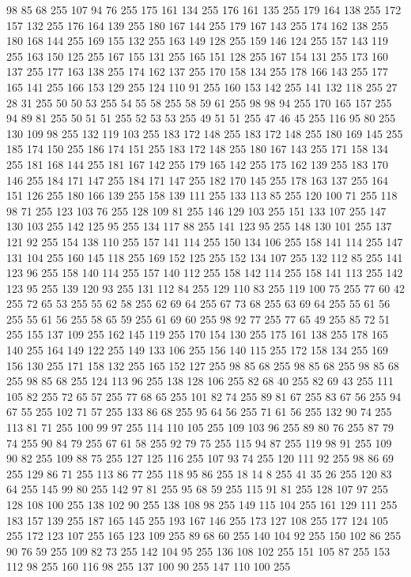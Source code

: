 98 85 68 255 107 94 76 255 175 161 134 255 176 161 135 255 179 164 138 255 172 157 132 255 176 164 139 255 180 167 144 255 179 167 143 255 174 162 138 255 180 168 144 255 169 155 132 255 163 149 128 255 159 146 124 255 157 143 119 255 163 150 125 255 167 155 131 255 165 151 128 255 167 154 131 255 173 160 137 255 177 163 138 255 174 162 137 255 170 158 134 255 178 166 143 255 177 165 141 255 166 153 129 255 124 110 91 255 160 153 142 255 141 132 118 255 27 28 31 255 50 50 53 255 54 55 58 255 58 59 61 255 98 98 94 255 170 165 157 255 94 89 81 255 50 51 51 255 52 53 53 255 49 51 51 255 47 46 45 255 116 95 80 255 130 109 98 255 132 119 103 255 183 172 148 255 183 172 148 255 180 169 145 255 185 174 150 255 186 174 151 255 183 172 148 255 180 167 143 255 171 158 134 255 181 168 144 255 181 167 142 255 179 165 142 255 175 162 139 255 183 170 146 255 184 171 147 255 184 171 147 255 182 170 145 255 178 163 137 255 164 151 126 255 180 166 139 255 158 139 111 255 133 113 85 255
120 100 71 255 118 98 71 255 123 103 76 255 128 109 81 255 146 129 103 255 151 133 107 255 147 130 103 255 142 125 95 255 134 117 88 255 141 123 95 255 148 130 101 255 137 121 92 255 154 138 110 255 157 141 114 255 150 134 106 255 158 141 114 255 147 131 104 255 160 145 118 255 169 152 125 255 152 134 107 255 132 112 85 255 141 123 96 255 158 140 114 255 157 140 112 255 158 142 114 255 158 141 113 255 142 123 95 255 139 120 93 255 131 112 84 255 129 110 83 255 119 100 75 255 77 60 42 255 72 65 53 255 55 62 58 255 62 69 64 255 67 73 68 255 63 69 64 255 55 61 56 255 55 61 56 255 58 65 59 255 61 69 60 255 98 92 77 255 77 65 49 255 85 72 51 255 155 137 109 255 162 145 119 255 170 154 130 255 175 161 138 255 178 165 140 255 164 149 122 255 149 133 106 255 156 140 115 255 172 158 134 255 169 156 130 255 171 158 132 255 165 152 127 255 98 85 68 255 98 85 68 255 98 85 68 255 98 85 68 255 124 113 96 255 138 128 106 255 82 68 40 255 82 69 43 255
111 105 82 255 72 65 57 255 77 68 65 255 101 82 74 255 89 81 67 255 83 67 56 255 94 67 55 255 102 71 57 255 133 86 68 255 95 64 56 255 71 61 56 255 132 90 74 255 113 81 71 255 100 99 97 255 114 110 105 255 109 103 96 255 89 80 76 255 87 79 74 255 90 84 79 255 67 61 58 255 92 79 75 255 115 94 87 255 119 98 91 255 109 90 82 255 109 88 75 255 127 125 116 255 107 93 74 255 120 111 92 255 98 86 69 255 129 86 71 255 113 86 77 255 118 95 86 255 18 14 8 255 41 35 26 255 120 83 64 255 145 99 80 255 142 97 81 255 95 68 59 255 115 91 81 255 128 107 97 255 128 108 100 255 138 102 90 255 138 108 98 255 149 115 104 255 161 129 111 255 183 157 139 255 187 165 145 255 193 167 146 255 173 127 108 255 177 124 105 255 172 123 107 255 165 123 109 255 89 68 60 255 140 104 92 255 150 102 86 255 90 76 59 255 109 82 73 255 142 104 95 255 136 108 102 255 151 105 87 255 153 112 98 255 160 116 98 255 137 100 90 255 147 110 100 255
